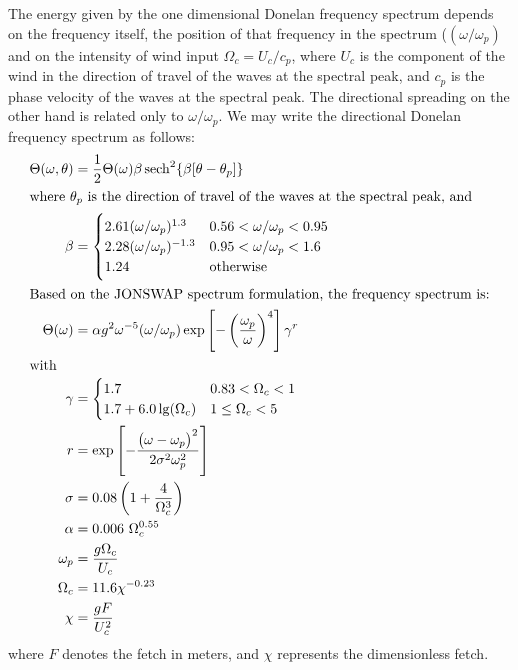 The energy given by the one dimensional Donelan frequency spectrum depends on 
the frequency itself, the position of that frequency in the spectrum 
($(\omega/\omega_p)$ and on the intensity of wind input $\Omega_c = U_c/c_p$, 
where $U_c$ is the component of the wind in the direction 
of travel of the waves at the spectral peak, and $c_p$ is the phase velocity of 
the waves at the spectral peak. The directional spreading on the other hand is 
related only to $\omega/\omega_p$. We may write the directional Donelan 
frequency spectrum as follows:
\begin{subequations}
\begin{align}
 \Theta(\omega, \theta) &= \frac{1}{2}\Theta(\omega)\beta\operatorname{sech}^2
\{\beta[\theta - \theta_p]\}\\
\intertext{where $\theta_p$ is the direction of travel of the waves at the 
spectral peak, and}
\beta &= \begin{cases}
	2.61(\omega/\omega_p)^{1.3} & 0.56 < \omega/\omega_p < 0.95\\
	2.28(\omega/\omega_p)^{-1.3} & 0.95 < \omega/\omega_p < 1.6\\
	1.24 & \text{otherwise}
    \end{cases} \\
\intertext{Based on the JONSWAP spectrum formulation, the frequency spectrum 
is:}
 \Theta(\omega) &= 
\alpha g^2 \omega^{-5}(\omega/\omega_p) \exp\left[-\left(\frac{\omega_p}{\omega}
\right)^4\right]\gamma^r\\
\intertext{with}
\gamma &= \begin{cases}
	1.7 & 0.83 < \Omega_c < 1\\
	1.7 + 6.0\lg(\Omega_c) & 1\leq\Omega_c < 5
	\end{cases}\\
r &= \exp\left[-\frac{\left(\omega -
\omega_p\right)^2}{2\sigma^2\omega_p^2}\right] \\
\sigma &= 0.08\left(1 + \frac{4}{\Omega_c^3}\right)\\
\alpha &= 0.006~\Omega_c^{0.55} \\
\omega_{p} &= \frac{g\Omega_c}{U_{c}}\\
\Omega_c &= 11.6\chi^{-0.23} \label{eq:donelan:omegac}\\
\chi &= \frac{gF}{U_{c}^{2}}
\end{align}
\end{subequations}
where $F$ denotes the fetch in meters, and $\chi$ represents the dimensionless
fetch.
